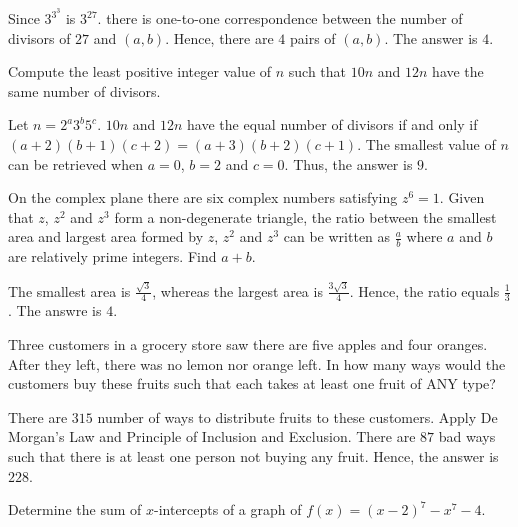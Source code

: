 \begin{solution}
Since $3^{3^3}$ is $3^{27}$. there is one-to-one correspondence between the number of divisors of $27$ and $(a,b)$. Hence, there are $4$ pairs of $(a,b)$. The answer is $4$.
\end{solution}

\begin{problem}
Compute the least positive integer value of $n$ such that $10n$ and $12n$ have the same number of divisors.
\end{problem}

\begin{solution}
Let $n=2^a3^b5^c$. $10n$ and $12n$ have the equal number of divisors if and only if $(a+2)(b+1)(c+2)=(a+3)(b+2)(c+1)$. The smallest value of $n$ can be retrieved when $a=0$, $b=2$ and $c=0$. Thus, the answer is $9$.
\end{solution}

\begin{problem}
On the complex plane there are six complex numbers satisfying $z^6=1$. Given that $z$, $z^2$ and $z^3$ form a non-degenerate triangle, the ratio between the smallest area and largest area formed by $z$, $z^2$ and $z^3$ can be written as $\frac{a}{b}$ where $a$ and $b$ are relatively prime integers. Find $a+b$.
\end{problem}

\begin{solution}
The smallest area is $\frac{\sqrt{3}}{4}$, whereas the largest area is $\frac{3\sqrt{3}}{4}$. Hence, the ratio equals $\frac{1}{3}$. The answre is $4$.
\end{solution}

\begin{problem}
Three customers in a grocery store saw there are five apples and four oranges. After they left, there was no lemon nor orange left. In how many ways would the customers buy these fruits such that each takes at least one fruit of ANY type?
\end{problem}

\begin{solution}
There are $315$ number of ways to distribute fruits to these customers. Apply De Morgan's Law and Principle of Inclusion and Exclusion. There are $87$ bad ways such that there is at least one person not buying any fruit. Hence, the answer is $228$.
\end{solution}

\begin{problem}
Determine the sum of $x$-intercepts of a graph of $f(x)=(x-2)^7-x^7-4$.
\end{problem}

